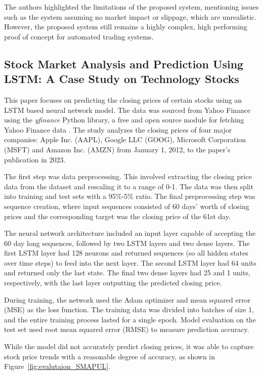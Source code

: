 \documentclass[a4paper,oneside,onecolumn,12pt]{book}
\begin{document}
	The authors highlighted the limitations of the proposed system, mentioning issues such as the system assuming no market impact or slippage, which are unrealistic. However, the proposed system still remains a highly complex, high performing proof of concept for automated trading systems.

	\subsection{Stock Market Analysis and Prediction Using LSTM: A Case Study on Technology Stocks \cite{LiYuXuLiuMo2023}}
	This paper focuses on predicting the closing prices of certain stocks using an LSTM based neural network model. The data was sourced from Yahoo Finance using the \textit{yfinance} Python library, a free and open source module for fetching Yahoo Finance data \cite{yfinance}. The study analyzes the closing prices of four major companies: Apple Inc. (AAPL), Google LLC (GOOG), Microsoft Corporation (MSFT) and Amazon Inc. (AMZN) from January 1, 2012, to the paper's publication in 2023.

	The first step was data preprocessing. This involved extracting the closing price data from the dataset and rescaling it to a range of 0-1. The data was then split into training and test sets with a 95\%-5\% ratio. The final preprocessing step was sequence creation, where input sequences consisted of 60 days' worth of closing prices and the corresponding target was the closing price of the 61st day.

	The neural network architecture included an input layer capable of accepting the 60 day long sequences, followed by two LSTM layers and two dense layers. The first LSTM layer had 128 neurons and returned sequences (so all hidden states over time steps) to feed into the next layer. The second LSTM layer had 64 units and returned only the last state. The final two dense layers had 25 and 1 units, respectively, with the last layer outputting the predicted closing price.

	During training, the network used the Adam optimizer and mean squared error (MSE) as the loss function. The training data was divided into batches of size 1, and the entire training process lasted for a single epoch. Model evaluation on the test set used root mean squared error (RMSE) to measure prediction accuracy. \cite{LiYuXuLiuMo2023}

	While the model did not accurately predict closing prices, it was able to capture stock price trends with a reasonable degree of accuracy, as shown in Figure~\ref{fig:evalutaion_SMAPUL}.
	
\end{document}
